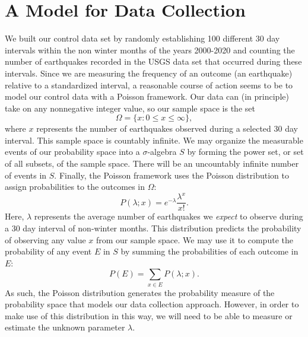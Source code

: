 \documentclass{amsart}
\begin{document}
\section{A Model for Data Collection}
We built our control data set by randomly establishing 100 different 30 day intervals within the non winter months of the years 2000-2020 and counting the number of earthquakes recorded in the USGS data set that occurred during these intervals. Since we are measuring the frequency of an outcome (an earthquake) relative to a standardized interval, a reasonable course of action seems to be to model our control data with a Poisson framework. Our data can (in principle) take on any nonnegative integer value, so our sample space is the set $$\Omega=\{x: 0\le x\le \infty\},$$  where $x$ represents the number of earthquakes observed during a selected 30 day interval.  This sample space is countably infinite. We may organize the measurable events of our probability space into a $\sigma$-algebra $S$ by forming the power set, or set of all subsets, of the sample space.  There will be an uncountably infinite number of events in $S$. Finally, the Poisson framework uses the Poisson distribution to assign probabilities to the outcomes in $\Omega$:
\[
P(\lambda;x)=e^{-\lambda}\frac{\lambda^x}{x!}.
\]
Here, $\lambda$ represents the average number of earthquakes we \textsl{expect} to observe during a 30 day interval of non-winter months. This distribution predicts the probability of observing any value $x$ from our sample space. We may use it to compute the probability of any event $E$ in $S$ by summing the probabilities of each outcome in $E$:
\[
P(E)=\sum_{x\in E} P(\lambda;x).
\]
As such, the Poisson distribution generates the probability measure of the probability space that models our data collection approach. However, in order to make use of this distribution in this way, we will need to be able to measure or estimate the unknown parameter $\lambda$.
\end{document}
